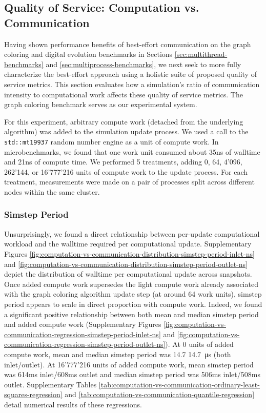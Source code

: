 \subsection{Quality of Service: Computation vs. Communication}

Having shown performance benefits of best-effort communication on the graph coloring and digital evolution benchmarks in Sections \ref{sec:multithread-benchmarks} and \ref{sec:multiprocess-benchmarks}, we next seek to more fully characterize the best-effort approach using a holistic suite of proposed quality of service metrics.
This section evaluates how a simulation's ratio of communication intensity to computational work affects these quality of service metrics.
The graph coloring benchmark serves as our experimental system.

For this experiment, arbitrary compute work (detached from the underlying algorithm) was added to the simulation update process.
We used a call to the \texttt{std::mt19937} random number engine as a unit of compute work.
In microbenchmarks, we found that one work unit consumed about 35ns of walltime and 21ns of compute time.
We performed 5 treatments, adding 0, 64, 4'096, 262'144, or 16'777'216 units of compute work to the update process.
For each treatment, measurements were made on a pair of processes split across different nodes within the same cluster.

\subsubsection{Simstep Period}

Unsurprisingly, we found a direct relationship between per-update computational workload and the walltime required per computational update.
Supplementary Figures \ref{fig:computation-vs-communication-distribution-simstep-period-inlet-ns} and \ref{fig:computation-vs-communication-distribution-simstep-period-outlet-ns} depict the distribution of walltime per computational update across snapshots.
Once added compute work supersedes the light compute work already associated with the graph coloring algorithm update step (at around 64 work units), simstep period appears to scale in direct proportion with compute work.
Indeed, we found a significant positive relationship between both mean and median simstep period and added compute work (Supplementary Figures \ref{fig:computation-vs-communication-regression-simstep-period-inlet-ns} and \ref{fig:computation-vs-communication-regression-simstep-period-outlet-ns}).
At 0 units of added compute work, mean and median simstep period was 14.7 \SI{14.7}{\micro\second} (both inlet/outlet).
At 16'777'216 units of added compute work, mean simstep period was 614ms inlet/608ms outlet and median simstep period was 506ms inlet/508ms outlet.
Supplementary Tables \ref{tab:computation-vs-communication-ordinary-least-squares-regression} and \ref{tab:computation-vs-communication-quantile-regression} detail numerical results of these regressions.

